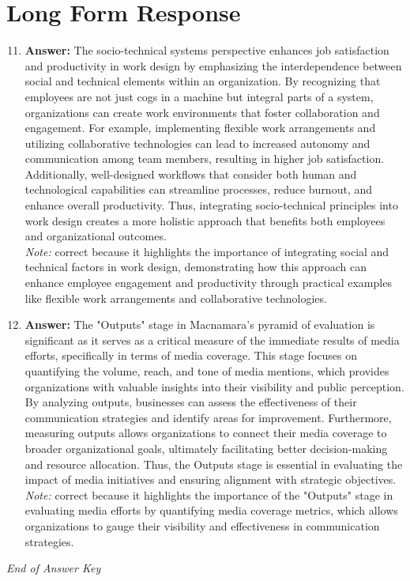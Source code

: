 \documentclass[12pt]{article}
\begin{document}
\section*{Long Form Response}
\begin{enumerate}[label=\arabic*.]
\setcounter{enumi}{10}
\item \textbf{Answer:} The socio-technical systems perspective enhances job satisfaction and productivity in work design by emphasizing the interdependence between social and technical elements within an organization. By recognizing that employees are not just cogs in a machine but integral parts of a system, organizations can create work environments that foster collaboration and engagement. For example, implementing flexible work arrangements and utilizing collaborative technologies can lead to increased autonomy and communication among team members, resulting in higher job satisfaction. Additionally, well-designed workflows that consider both human and technological capabilities can streamline processes, reduce burnout, and enhance overall productivity. Thus, integrating socio-technical principles into work design creates a more holistic approach that benefits both employees and organizational outcomes.
\\ \textit{Note:} correct because it highlights the importance of integrating social and technical factors in work design, demonstrating how this approach can enhance employee engagement and productivity through practical examples like flexible work arrangements and collaborative technologies.
\item \textbf{Answer:} The "Outputs" stage in Macnamara's pyramid of evaluation is significant as it serves as a critical measure of the immediate results of media efforts, specifically in terms of media coverage. This stage focuses on quantifying the volume, reach, and tone of media mentions, which provides organizations with valuable insights into their visibility and public perception. By analyzing outputs, businesses can assess the effectiveness of their communication strategies and identify areas for improvement. Furthermore, measuring outputs allows organizations to connect their media coverage to broader organizational goals, ultimately facilitating better decision-making and resource allocation. Thus, the Outputs stage is essential in evaluating the impact of media initiatives and ensuring alignment with strategic objectives.
\\ \textit{Note:} correct because it highlights the importance of the "Outputs" stage in evaluating media efforts by quantifying media coverage metrics, which allows organizations to gauge their visibility and effectiveness in communication strategies.
\end{enumerate}

\vfill
\noindent\textit{End of Answer Key}
\end{document}
